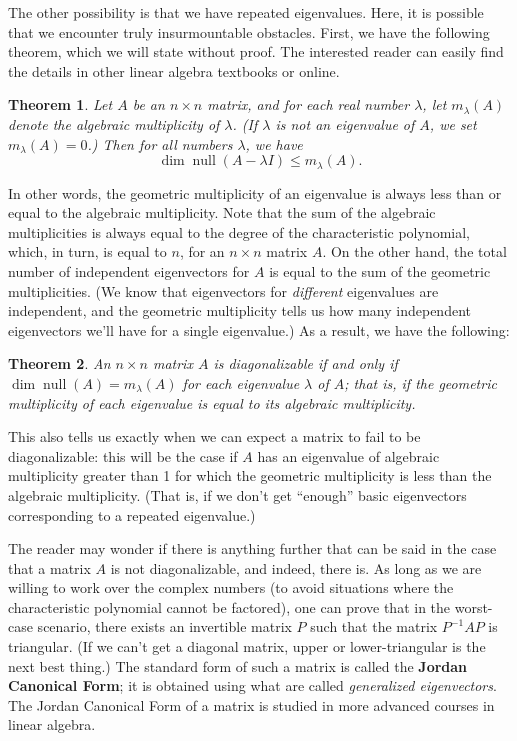 \documentclass[12pt,letterpaper]{article}
\newtheorem{theorem}{Theorem}
\begin{document}
The other possibility is that we have repeated eigenvalues. Here, it is possible that we encounter truly insurmountable obstacles. First, we have the following theorem, which we will state without proof. The interested reader can easily find the details in other linear algebra textbooks or online.

\begin{theorem}
 Let $A$ be an $n\times n$ matrix, and for each real number $\lambda$, let $m_\lambda(A)$ denote the \textit{algebraic} multiplicity of $\lambda$. (If $\lambda$ is not an eigenvalue of $A$, we set $m_\lambda(A)=0$.) Then for all numbers $\lambda$, we have
\[
 \dim\operatorname{null}(A-\lambda I)\leq m_\lambda(A).
\]
\end{theorem}
In other words, the geometric multiplicity of an eigenvalue is always less than or equal to the algebraic multiplicity. Note that the sum of the algebraic multiplicities is always equal to the degree of the characteristic polynomial, which, in turn, is equal to $n$, for an $n\times n$ matrix $A$. On the other hand, the total number of independent eigenvectors for $A$ is equal to the sum of the geometric multiplicities. (We know that eigenvectors for \textit{different} eigenvalues are independent, and the geometric multiplicity tells us how many independent eigenvectors we'll have for a single eigenvalue.) As a result, we have the following:
\begin{theorem}
 An $n\times n$ matrix $A$ is diagonalizable if and only if $\dim\operatorname{null}(A) = m_\lambda(A)$ for each eigenvalue $\lambda$ of $A$; that is, if the geometric multiplicity of each eigenvalue is equal to its algebraic multiplicity.
\end{theorem}
This also tells us exactly when we can expect a matrix to fail to be diagonalizable: this will be the case if $A$ has an eigenvalue of algebraic multiplicity greater than 1 for which the geometric multiplicity is less than the algebraic multiplicity. (That is, if we don't get ``enough'' basic eigenvectors corresponding to a repeated eigenvalue.)

\medskip

The reader may wonder if there is anything further that can be said in the case that a matrix $A$ is not diagonalizable, and indeed, there is. As long as we are willing to work over the complex numbers (to avoid situations where the characteristic polynomial cannot be factored), one can prove that in the worst-case scenario, there exists an invertible matrix $P$ such that the matrix $P^{-1}AP$ is triangular. (If we can't get a diagonal matrix, upper or lower-triangular is the next best thing.) The standard form of such a matrix is called the \textbf{Jordan Canonical Form}; it is obtained using what are called \textit{generalized eigenvectors}. The Jordan Canonical Form of a matrix is studied in more advanced courses in linear algebra.
\end{document}
